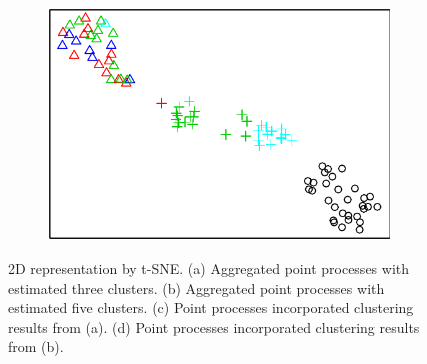 \begin{figure}[H]
\begin{subfigure}{.49\textwidth}
\caption{}
\end{subfigure}
\begin{subfigure}{.49\textwidth}
\includegraphics[width=\textwidth]{../simulation/plots/overclus_c}
\caption{}
\end{subfigure}
\caption{
2D representation by t-SNE.
(a) Aggregated point processes with  estimated three clusters.
(b) Aggregated point processes with estimated five clusters.
(c) Point processes incorporated clustering results from (a).
(d) Point processes incorporated clustering results from (b). }
\label{fig: explain overclustering}
\end{figure}
















